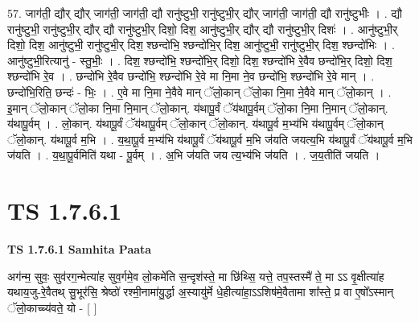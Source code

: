 \documentclass[17pt]{extarticle}
\begin{document}
57. जाग॑ती॒ द्यौर् द्यौर् जाग॑ती॒ जाग॑ती॒ द्यौ रानु॑ष्टुभी॒ रानु॑ष्टुभी॒र् द्यौर् जाग॑ती॒ जाग॑ती॒ द्यौ रानु॑ष्टुभीः । . द्यौ रानु॑ष्टुभी॒ रानु॑ष्टुभी॒र् द्यौर् द्यौ रानु॑ष्टुभी॒र् दिशो॒ दिश॒ आनु॑ष्टुभी॒र् द्यौर् द्यौ रानु॑ष्टुभी॒र् दिशः॑ । . आनु॑ष्टुभी॒र् दिशो॒ दिश॒ आनु॑ष्टुभी॒ रानु॑ष्टुभी॒र् दिश॒ श्छन्दो॑भि॒ श्छन्दो॑भि॒र् दिश॒ आनु॑ष्टुभी॒ रानु॑ष्टुभी॒र् दिश॒ श्छन्दो॑भिः । . आनु॑ष्टुभी॒रित्यानु॑ - स्तु॒भीः॒ । . दिश॒ श्छन्दो॑भि॒ श्छन्दो॑भि॒र् दिशो॒ दिश॒ श्छन्दो॑भि रे॒वैव छन्दो॑भि॒र् दिशो॒ दिश॒ श्छन्दो॑भि रे॒व । . छन्दो॑भि रे॒वैव छन्दो॑भि॒ श्छन्दो॑भि रे॒वे मा नि॒मा ने॒व छन्दो॑भि॒ श्छन्दो॑भि रे॒वे मान् । . छन्दो॑भि॒रिति॒ छन्दः॑ - भिः॒ । . ए॒वे मा नि॒मा ने॒वैवे मान् ॅलो॒कान् ॅलो॒का नि॒मा ने॒वैवे मान् ॅलो॒कान् । . इ॒मान् ॅलो॒कान् ॅलो॒का नि॒मा नि॒मान् ॅलो॒कान्. य॑थापू॒र्वं ॅय॑थापू॒र्वम् ॅलो॒का नि॒मा नि॒मान् ॅलो॒कान्. य॑थापू॒र्वम् । . लो॒कान्. य॑थापू॒र्वं ॅय॑थापू॒र्वम् ॅलो॒कान् ॅलो॒कान्. य॑थापू॒र्व म॒भ्य॑भि य॑थापू॒र्वम् ॅलो॒कान् 
ॅलो॒कान्. य॑थापू॒र्व म॒भि । . य॒था॒पू॒र्व म॒भ्य॑भि य॑थापू॒र्वं ॅय॑थापू॒र्व म॒भि ज॑यति जयत्य॒भि य॑थापू॒र्वं ॅय॑थापू॒र्व म॒भि ज॑यति । . य॒था॒पू॒र्वमिति॑ यथा - पू॒र्वम् । . अ॒भि ज॑यति जय त्य॒भ्य॑भि ज॑यति । . ज॒य॒तीति॑ जयति । \newline
\pagebreak
{}
\section*{ TS 1.7.6.1 }

\textbf{TS 1.7.6.1 } \newline
\textbf{Samhita Paata} \newline

अग॑न्म॒ सुवः॒ सुव॑रग॒न्मेत्या॑ह सुव॒र्गमे॒व लो॒कमे॑ति स॒न्दृश॑स्ते॒ मा छि॑थ्सि॒ यत्ते॒ तप॒स्तस्मै॑ ते॒ मा ऽऽ वृ॒क्षीत्या॑ह यथाय॒जु-रे॒वैतथ् सु॒भूर॑सि॒ श्रेष्ठो॑ रश्मी॒नामा॑यु॒र्द्धा अ॒स्यायु॑र्मे धे॒हीत्या॑हा॒ऽऽशिष॑मे॒वैतामा शा᳚स्ते॒ प्र वा ए॒षो᳚ऽस्मान् ॅलो॒काच्च्य॑वते॒ यो - [ ] \newline
\end{document}
